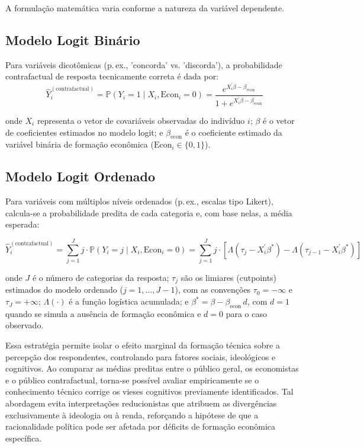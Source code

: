 A formulação matemática varia conforme a natureza da variável dependente.

\subsection{Modelo Logit Binário}

Para variáveis dicotômicas (p.\,ex., 'concorda' vs. 'discorda'), a probabilidade contrafactual de resposta tecnicamente correta é dada por:
\begin{equation}\label{eq:contra_bin}
\hat{Y}_i^{(\text{contrafactual})} = \mathbb{P}(Y_i = 1 \mid X_i, \text{Econ}_i = 0) = \frac{e^{X_i^\prime \beta - \beta_{\text{econ}}}}{1 + e^{X_i^\prime \beta - \beta_{\text{econ}}}}
\end{equation}

\noindent
onde $X_i$ representa o vetor de covariáveis observadas do indivíduo $i$; $\beta$ é o vetor de coeficientes estimados no modelo logit; e $\beta_{\text{econ}}$ é o coeficiente estimado da variável binária de formação econômica ($\text{Econ}_i\in\{0,1\}$).

\subsection{Modelo Logit Ordenado}

Para variáveis com múltiplos níveis ordenados (p.\,ex., escalas tipo Likert), calcula-se a probabilidade predita de cada categoria e, com base nelas, a média esperada:

\begin{equation}\label{eq:contra_ord}
\hat{Y}_i^{(\text{contrafactual})} = \sum_{j=1}^J j \cdot \mathbb{P}(Y_i = j \mid X_i, \text{Econ}_i = 0) = \sum_{j=1}^J j \cdot \left[ \Lambda(\tau_j - X_i^\prime \beta^*) - \Lambda(\tau_{j-1} - X_i^\prime \beta^*) \right]
\end{equation}

\noindent
onde $J$ é o número de categorias da resposta; $\tau_j$ são os limiares (cutpoints) estimados do modelo ordenado ($j=1,\ldots,J-1$), com as convenções $\tau_0=-\infty$ e $\tau_J=+\infty$; $\Lambda(\cdot)$ é a função logística acumulada; e $\beta^{*} = \beta - \beta_{\text{econ}}\,d$, com $d=1$ quando se simula a ausência de formação econômica e $d=0$ para o caso observado.

Essa estratégia permite isolar o efeito marginal da formação técnica sobre a percepção dos respondentes, controlando para fatores sociais, ideológicos e cognitivos. Ao comparar as médias preditas entre o público geral, os economistas e o público contrafactual, torna-se possível avaliar empiricamente se o conhecimento técnico corrige os vieses cognitivos previamente identificados. Tal abordagem evita interpretações reducionistas que atribuem as divergências exclusivamente à ideologia ou à renda, reforçando a hipótese de que a racionalidade política pode ser afetada por déficits de formação econômica específica.

